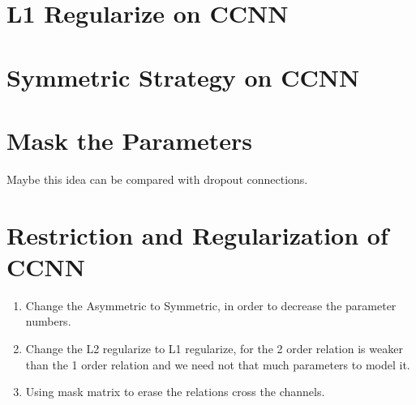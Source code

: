 \documentclass[12pt]{article}
\begin{document}
\section{L1 Regularize on CCNN}


\section{Symmetric Strategy on CCNN}

\section{Mask the Parameters}
Maybe this idea can be compared with dropout connections.

\clearpage
\section{Restriction and Regularization of CCNN}
\begin{enumerate}
    \item Change the Asymmetric to Symmetric, in order to decrease the parameter numbers.
    \item Change the L2 regularize to L1 regularize, for the 2 order relation is weaker than the 1 order relation and we need not that much parameters to model it.
    \item Using mask matrix to erase the relations cross the channels.
\end{enumerate}
\end{document}
